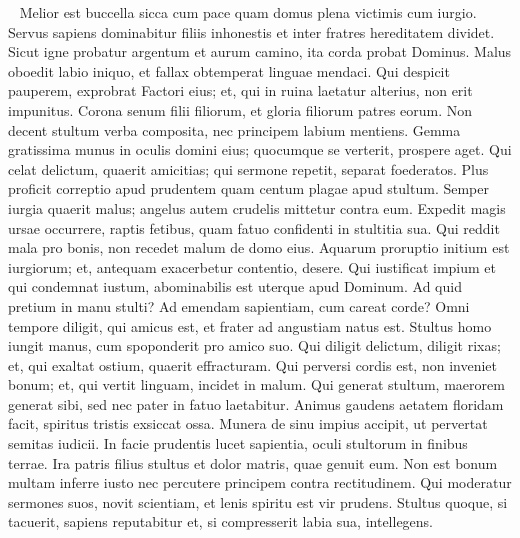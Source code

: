 \begin{biblechapter}   
\verse Melior est buccella sicca cum pace quam domus plena victimis cum iurgio. 
\verse Servus sapiens dominabitur filiis inhonestis et inter fratres hereditatem dividet. 
\verse Sicut igne probatur argentum et aurum camino, ita corda probat Dominus. 
\verse Malus oboedit labio iniquo, et fallax obtemperat linguae mendaci. 
\verse Qui despicit pauperem, exprobrat Factori eius; et, qui in ruina laetatur alterius, non erit impunitus. 
\verse Corona senum filii filiorum, et gloria filiorum patres eorum. 
\verse Non decent stultum verba composita, nec principem labium mentiens. 
\verse Gemma gratissima munus in oculis domini eius; quocumque se verterit, prospere aget. 
\verse Qui celat delictum, quaerit amicitias; qui sermone repetit, separat foederatos. 
\verse Plus proficit correptio apud prudentem quam centum plagae apud stultum. 
\verse Semper iurgia quaerit malus; angelus autem crudelis mittetur contra eum. 
\verse Expedit magis ursae occurrere, raptis fetibus, quam fatuo confidenti in stultitia sua. 
\verse Qui reddit mala pro bonis, non recedet malum de domo eius. 
\verse Aquarum proruptio initium est iurgiorum; et, antequam exacerbetur contentio, desere. 
\verse Qui iustificat impium et qui condemnat iustum, abominabilis est uterque apud Dominum. 
\verse Ad quid pretium in manu stulti? Ad emendam sapientiam, cum careat corde? 
\verse Omni tempore diligit, qui amicus est, et frater ad angustiam natus est. 
\verse Stultus homo iungit manus, cum spoponderit pro amico suo. 
\verse Qui diligit delictum, diligit rixas; et, qui exaltat ostium, quaerit effracturam. 
\verse Qui perversi cordis est, non inveniet bonum; et, qui vertit linguam, incidet in malum. 
\verse Qui generat stultum, maerorem generat sibi, sed nec pater in fatuo laetabitur. 
\verse Animus gaudens aetatem floridam facit, spiritus tristis exsiccat ossa. 
\verse Munera de sinu impius accipit, ut pervertat semitas iudicii. 
\verse In facie prudentis lucet sapientia, oculi stultorum in finibus terrae. 
\verse Ira patris filius stultus et dolor matris, quae genuit eum. 
\verse Non est bonum multam inferre iusto nec percutere principem contra rectitudinem. 
\verse Qui moderatur sermones suos, novit scientiam, et lenis spiritu est vir prudens. 
\verse Stultus quoque, si tacuerit, sapiens reputabitur et, si compresserit labia sua, intellegens. 
\end{biblechapter}

